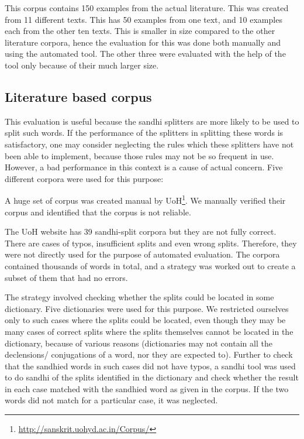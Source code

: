 \documentclass[11pt]{article}
\begin{document}
This corpus contains 150 examples from the actual literature.  This was created from 11 different texts. This has 50 examples from one text, and 10 examples each from the other ten texts. This is smaller in size compared to the other literature corpora, hence the evaluation for this was done both manually and using the automated tool. The other three were evaluated with the help of the tool only because of their much larger size.

\subsection{Literature based corpus}


This evaluation is useful because the sandhi splitters are more likely to be used to split such words. If the performance of the splitters in splitting these words is satisfactory, one may consider neglecting the rules which these splitters have not been able to implement, because those rules may not be so frequent in use. However, a bad performance in this context is a cause of actual concern. 
Five different corpora were used for this purpose:

A huge set of corpus was created manual by UoH\footnote{\url{http://sanskrit.uohyd.ac.in/Corpus/}}. We manually verified their corpus and identified that the corpus is not reliable.

The UoH website has 39 sandhi-split corpora but they are not fully correct. There are cases of typos, insufficient splits and even wrong splits. Therefore, they were not directly used for the purpose of automated evaluation. The corpora contained thousands of words in total, and a strategy was worked out to create a subset of them that had no errors.

The strategy involved checking whether the splits could be located in some dictionary. Five dictionaries were used for this purpose. We restricted ourselves only to such cases where the splits could be located, even though they may be many cases of correct splits where the splits themselves cannot be located in the dictionary, because of various reasons (dictionaries may not contain all the declensions/ conjugations of a word, nor they are expected to). Further to check that the sandhied words in such cases did not have typos, a sandhi tool was used to do sandhi of the splits identified in the dictionary and check whether the result in each case matched with the sandhied word as given in the corpus. If the two words did not match for a particular case, it was neglected.
\end{document}
